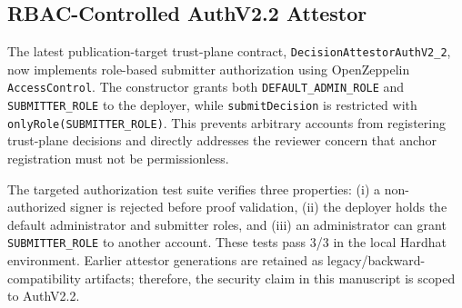 \subsection{RBAC-Controlled AuthV2.2 Attestor}

The latest publication-target trust-plane contract, \texttt{DecisionAttestorAuthV2\_2}, now implements role-based submitter authorization using OpenZeppelin \texttt{AccessControl}. The constructor grants both \texttt{DEFAULT\_ADMIN\_ROLE} and \texttt{SUBMITTER\_ROLE} to the deployer, while \texttt{submitDecision} is restricted with \texttt{onlyRole(SUBMITTER\_ROLE)}. This prevents arbitrary accounts from registering trust-plane decisions and directly addresses the reviewer concern that anchor registration must not be permissionless.

The targeted authorization test suite verifies three properties: (i) a non-authorized signer is rejected before proof validation, (ii) the deployer holds the default administrator and submitter roles, and (iii) an administrator can grant \texttt{SUBMITTER\_ROLE} to another account. These tests pass 3/3 in the local Hardhat environment. Earlier attestor generations are retained as legacy/backward-compatibility artifacts; therefore, the security claim in this manuscript is scoped to AuthV2.2.
